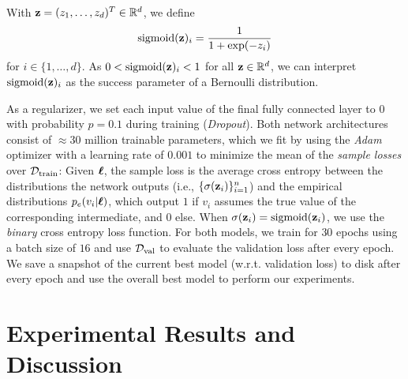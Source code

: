 \begin{definition}
    With $\mathbf{z} = (z_1,\dots,z_d)^T \in \mathbb{R}^d$, we define
    \begin{align}
        \operatorname{sigmoid}(\mathbf{z})_i = \frac{1}{1 + \exp(-z_i)}
    \end{align}
    for $i \in \{1,\dots,d\}$.
    As $0 < \operatorname{sigmoid}(\mathbf{z})_i < 1$ for all $\mathbf{z} \in \mathbb{R}^d$, we can interpret $\operatorname{sigmoid}(\mathbf{z})_i$ as the success parameter of a Bernoulli distribution.
\end{definition}

As a regularizer, we set each input value of the final fully connected layer to $0$ with probability $p=0.1$ during training (\emph{Dropout}). Both network architectures consist of $\approx 30$ million trainable parameters, which we fit by using the \emph{Adam} optimizer \cite{adam} with a learning rate of $0.001$ to minimize the mean of the \emph{sample losses} over $\mathcal{D}_{\text{train}}$: Given $\boldsymbol{\ell}$, the sample loss is the average cross entropy between the distributions the network outputs (i.e., $\{ \sigma(\mathbf{z}_i) \}_{i=1}^n$) and the empirical distributions $p_e(v_i | \boldsymbol{\ell})$, which output $1$ if $v_i$ assumes the true value of the corresponding intermediate, and $0$ else. When $\sigma(\mathbf{z}_i) = \operatorname{sigmoid}(\mathbf{z}_i)$, we use the \emph{binary} cross entropy loss function.
For both models, we train for $30$ epochs using a batch size of $16$ and use $\mathcal{D}_{\text{val}}$ to evaluate the validation loss after every epoch. We save a snapshot of the current best model (w.r.t. validation loss) to disk after every epoch and use the overall best model to perform our experiments.

\section{Experimental Results and Discussion}


